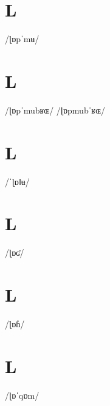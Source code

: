 \documentclass[10pt,a4paper,twoside]{book}
\begin{document}
\section*{L}

\begin{multicols}{3}
 {/ɭɒpˈmʉ/} {}
\end{multicols}

\section*{L}

\begin{multicols}{3}
 {/ɭɒpˈmubʁɶ/} {}
 {/ɭɒpmubˈʁɶ/} {}
\end{multicols}

\section*{L}

\begin{multicols}{3}
 {/ˈɭɒǁʉ/} {}
\end{multicols}

\section*{L}

\begin{multicols}{3}
 {/ɭɒʛ/} {}
\end{multicols}

\section*{L}

\begin{multicols}{3}
 {/ɭɒɦ/} {}
\end{multicols}

\section*{L}

\begin{multicols}{3}
 {/ɭɒˈqɒm/} {}
\end{multicols}
\end{document}
